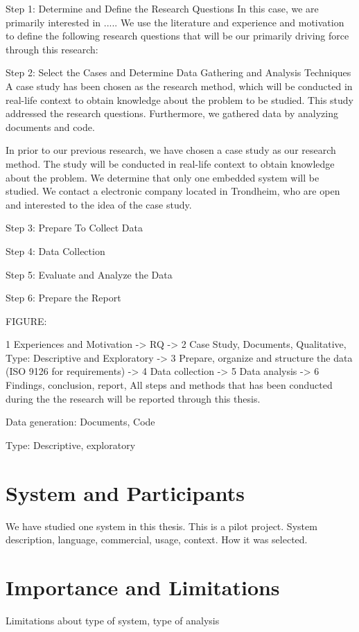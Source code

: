 Step 1: Determine and Define the Research Questions
In this case, we are primarily interested in ..... We use the literature and experience and motivation to define the following research questions that will be our primarily driving force through this research:



Step 2: Select the Cases and Determine Data Gathering and Analysis Techniques
A case study has been chosen as the research method, which will be conducted in real-life context to obtain knowledge about the problem to be studied. This study addressed the research questions. Furthermore, we gathered data by analyzing documents and code. %

In prior to our previous research, we have chosen a case study as our research method. The study will be conducted in real-life context to obtain knowledge about the problem.  We determine that only one embedded system will be studied. We contact a electronic company located in Trondheim, who are open and interested to the idea of the case study.

Step 3: Prepare To Collect Data

Step 4: Data Collection

Step 5: Evaluate and Analyze the Data

Step 6: Prepare the Report


FIGURE:

1 {Experiences and Motivation -> RQ} -> 2 {Case Study, Documents, Qualitative, Type: Descriptive and Exploratory} -> 3 {Prepare, organize and structure the data (ISO 9126 for requirements)} -> 4 {Data collection} -> 5 {Data analysis} -> 6 {Findings, conclusion, report,  All steps and methods that has been conducted during the the research will be reported through this thesis. }




Data generation: Documents, Code

Type: Descriptive, exploratory


\section{System and Participants}
We have studied one system in this thesis. This is a pilot project. System description, language, commercial, usage, context. How it was selected.



      


\section{Importance and Limitations}
Limitations about type of system, type of analysis

